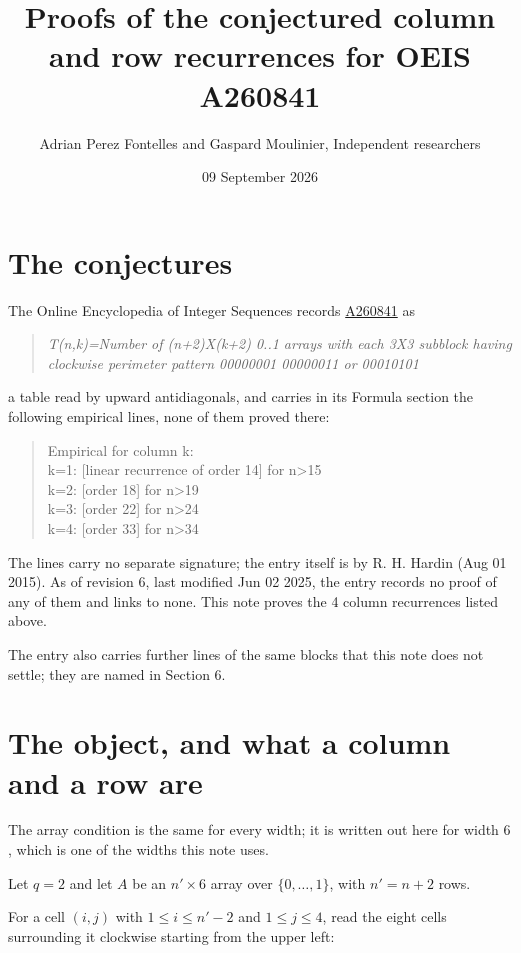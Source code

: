 \documentclass[11pt]{article}
\title{Proofs of the conjectured column and row recurrences for OEIS A260841}
\author{Adrian Perez Fontelles and Gaspard Moulinier, Independent researchers}
\date{09 September 2026}
\theoremstyle{definition}
\begin{document}
\maketitle
\section{The conjectures}

The Online Encyclopedia of Integer Sequences records \href{https://oeis.org/A260841}{A260841} as

\begin{quote}\itshape T(n,k)=Number of (n+2)X(k+2) 0..1 arrays with each 3X3 subblock having clockwise perimeter pattern 00000001 00000011 or 00010101\end{quote}

a table read by upward antidiagonals, and carries in its Formula section the following empirical lines, none of them proved there:

\begin{quote}\ttfamily Empirical for column k:\\
k=1: [linear recurrence of order 14] for n>15\\k=2: [order 18] for n>19\\k=3: [order 22] for n>24\\k=4: [order 33] for n>34\end{quote}

The lines carry no separate signature; the entry itself is by R. H. Hardin (Aug 01 2015). As of revision 6, last modified Jun 02 2025, the entry records no proof of any of them and links to none. This note proves the 4 column recurrences listed above.

The entry also carries further lines of the same blocks that this note does not settle; they are named in Section 6.

\section{The object, and what a column and a row are}

The array condition is the same for every width; it is written out here for width $6$, which is one of the widths this note uses.

Let $q = 2$ and let $A$ be an $n' \times 6$ array over $\{0,\dots,1\}$, with $n' = n + 2$ rows.

For a cell $(i,j)$ with $1 \le i \le n'-2$ and $1 \le j \le 4$, read the eight cells surrounding it clockwise starting from the upper left:
\end{document}
